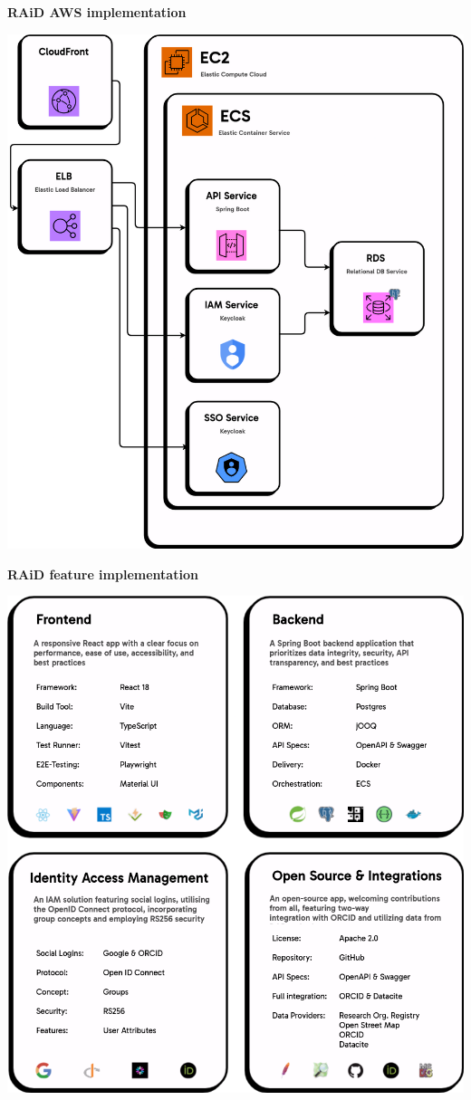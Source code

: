 \documentclass[a0,portrait]{a0poster}
\newenvironment{Figure}
  {\par\medskip\noindent\minipage{\linewidth}}
  {\endminipage\par\medskip}
\begin{document}
\begin{multicols}{3}
\vspace{1cm}

\centerline{\textbf{RAiD AWS implementation}}
\begin{Figure}
  \centering
  \includegraphics[width=0.75\linewidth]{figures/20241023-raid-architecture-appflow-aws.png}
  \label{aws-architecture}
\end{Figure}

\vspace{1cm}

\centerline{\textbf{RAiD feature implementation}}
\begin{Figure}
  \centering
  \includegraphics[width=0.75\linewidth]{figures/20241023-raid-architecture-feature-boxes.png}
  \label{reature-implementation}
\end{Figure}



\end{multicols}
\end{document}
